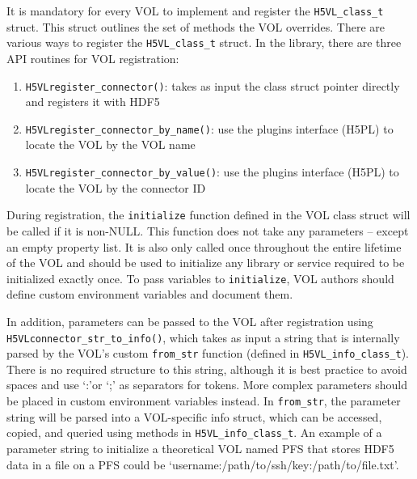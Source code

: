 It is mandatory for every VOL to implement and register the \texttt{H5VL\_class\_t} struct. This struct outlines the set of methods the VOL overrides. There are various ways to register the \texttt{H5VL\_class\_t} struct. In the library, there are three API routines for VOL registration:
\begin{enumerate}
    \item \texttt{H5VLregister\_connector()}: takes as input the class struct pointer directly and registers it with HDF5
    \item \texttt{H5VLregister\_connector\_by\_name()}: use the plugins interface (H5PL) to locate the VOL by the VOL name
    \item \texttt{H5VLregister\_connector\_by\_value()}: use the plugins interface (H5PL) to locate the VOL by the connector ID
\end{enumerate}
During registration, the \texttt{initialize} function defined in the VOL class struct will be called if it is non-NULL. This function does not take any parameters -- except an empty property list. It is also only called once throughout the entire lifetime of the VOL and should be used to initialize any library or service required to be initialized exactly once. To pass variables to \texttt{initialize}, VOL authors should define custom environment variables and document them.

In addition, parameters can be passed to the VOL after registration using \texttt{H5VLconnector\_str\_to\_info()}, which takes as input a string that is internally parsed by the VOL's custom \texttt{from\_str} function (defined in \texttt{H5VL\_info\_class\_t}). There is no required structure to this string, although it is best practice to avoid spaces and use `:'or `;' as separators for tokens. More complex parameters should be placed in custom environment variables instead. In \texttt{from\_str}, the parameter string will be parsed into a VOL-specific info struct, which can be accessed, copied, and queried using methods in \texttt{H5VL\_info\_class\_t}. An example of a parameter string to initialize a theoretical VOL named PFS that stores HDF5 data in a file on a PFS could be `username:/path/to/ssh/key:/path/to/file.txt'.

